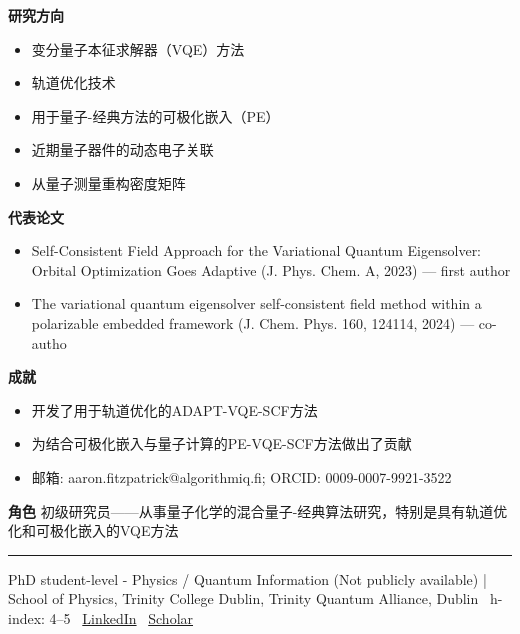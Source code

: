 \par{\footnotesize\color{mainred}\textbf{研究方向}}
\begin{itemize}[leftmargin=1.2em,itemsep=0pt,topsep=0pt]
\item {\footnotesize 变分量子本征求解器（VQE）方法}
\item {\footnotesize 轨道优化技术}
\item {\footnotesize 用于量子-经典方法的可极化嵌入（PE）}
\item {\footnotesize 近期量子器件的动态电子关联}
\item {\footnotesize 从量子测量重构密度矩阵}
\end{itemize}
\par{\footnotesize\color{mainred}\textbf{代表论文}}
\begin{itemize}[leftmargin=1.2em,itemsep=0pt,topsep=0pt]
\item {\footnotesize Self-Consistent Field Approach for the Variational Quantum Eigensolver: Orbital Optimization Goes Adaptive (J. Phys. Chem. A, 2023) — first author}
\item {\footnotesize The variational quantum eigensolver self-consistent field method within a polarizable embedded framework (J. Chem. Phys. 160, 124114, 2024) — co-autho}
\end{itemize}
\par{\footnotesize\color{mainred}\textbf{成就}}
\begin{itemize}[leftmargin=1.2em,itemsep=0pt,topsep=0pt]
\item {\footnotesize 开发了用于轨道优化的ADAPT-VQE-SCF方法}
\item {\footnotesize 为结合可极化嵌入与量子计算的PE-VQE-SCF方法做出了贡献}
\item {\footnotesize 邮箱: aaron.fitzpatrick@algorithmiq.fi; ORCID: 0009-0007-9921-3522}
\end{itemize}
\par{\footnotesize\color{mainred}\textbf{角色}} {\footnotesize 初级研究员——从事量子化学的混合量子-经典算法研究，特别是具有轨道优化和可极化嵌入的VQE方法}
\vspace{2pt}\hrule\vspace{2pt}
\vspace{4pt}
\par{\footnotesize\color{graytext}PhD student-level - Physics / Quantum Information (Not publicly available) | School of Physics, Trinity College Dublin, Trinity Quantum Alliance, Dublin \textbar\  h-index: 4–5 \textbar\  \href{https://www.linkedin.com/in/aaron-miller-07a990197/}{LinkedIn} \textbar\  \href{Not publicly found}{Scholar}}
